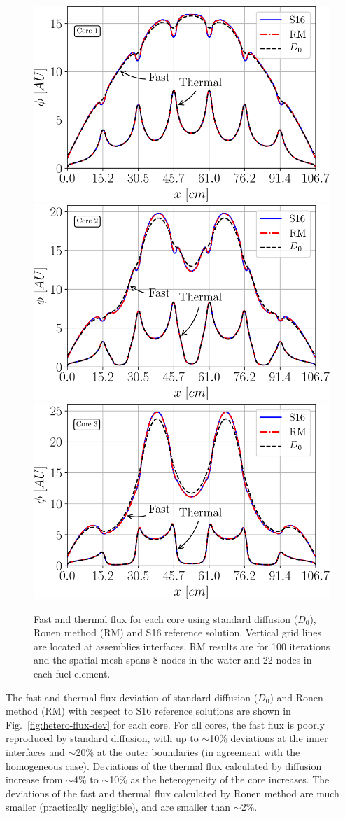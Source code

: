\begin{figure}[htbp!]
	\centering
	\includegraphics[width=0.32\linewidth]{Sn_Diff_RM_core_1.pdf}
	\includegraphics[width=0.32\linewidth]{Sn_Diff_RM_core_2.pdf}
	\includegraphics[width=0.32\linewidth]{Sn_Diff_RM_core_3.pdf}
	\caption{Fast and thermal flux for each core using standard diffusion ($D_0$), Ronen method (RM) and S16 reference solution. Vertical grid lines are located at assemblies interfaces. RM results are for 100 iterations and the spatial mesh spans 8 nodes in the water and 22 nodes in each fuel element.}
	\label{fig:hetero-flux}
\end{figure}

The fast and thermal flux deviation of standard diffusion ($D_0$) and Ronen method (RM) with respect to S16 reference solutions are shown in Fig.~\ref{fig:hetero-flux-dev} for each core. For all cores, the fast flux is poorly reproduced by standard diffusion, with up to $\sim$10\% deviations at the inner interfaces and $\sim$20\% at the outer boundaries (in agreement with the homogeneous case). Deviations of the thermal flux calculated by diffusion increase from $\sim$4\% to $\sim$10\% as the heterogeneity of the core increases. The deviations of the fast and thermal flux calculated by Ronen method are much smaller (practically negligible), and are smaller than $\sim$2\%. 

